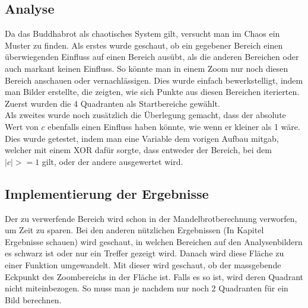 \subsection{Analyse}
Da das Buddhabrot als chaotisches System gilt, versucht man im Chaos ein Muster zu finden. Als erstes wurde geschaut, ob ein gegebener Bereich einen überwiegenden Einfluss auf einen Bereich ausübt, als die anderen Bereichen oder auch markant keinen Einfluss. So könnte man in einem Zoom nur noch diesen Bereich anschauen oder vernachlässigen. Dies wurde einfach bewerkstelligt, indem man Bilder erstellte, die zeigten, wie sich Punkte aus diesen Bereichen iterierten. Zuerst wurden die 4 Quadranten als Startbereiche gewählt.
\\
Als zweites wurde noch zusätzlich die Überlegung gemacht, dass der absolute Wert von $c$ ebenfalls einen Einfluss haben könnte, wie wenn er kleiner als 1 wäre. Dies wurde getestet, indem man eine Variable dem vorigen Aufbau mitgab, welcher mit einem XOR dafür sorgte, dass entweder der Bereich, bei dem $|c|>=1$ gilt, oder der andere ausgewertet wird.
\subsection{Implementierung der Ergebnisse}
Der zu verwerfende Bereich wird schon in der Mandelbrotberechnung verworfen, um Zeit zu sparen. Bei den anderen nützlichen Ergebnissen (In Kapitel Ergebnisse schauen) wird geschaut, in welchen Bereichen auf den Analysenbildern es schwarz ist oder nur ein Treffer gezeigt wird. Danach wird diese Fläche zu einer Funktion umgewandelt. Mit dieser wird geschaut, ob der massgebende Eckpunkt des Zoombereichs in der Fläche ist. Falls es so ist, wird deren Quadrant nicht miteinbezogen. So muss man je nachdem nur noch 2 Quadranten für ein Bild berechnen.